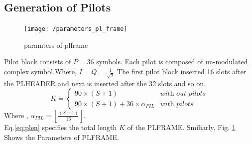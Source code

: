 \documentclass[journal,12pt,twocolumn]{IEEEtran}
\begin{document}
\subsection{Generation of Pilots}
%
\begin{figure}
\begin{center}
\texttt{[image: /parameters\_pl\_frame]}
\end{center}
\caption{paramters of plframe}
\label{fig:plframe}
\end{figure}
%
Pilot block consists of $P=36$ symbols. Each pilot is composed of un-modulated complex symbol.Where, $I=Q=\frac{1}{\sqrt{2}}$ The first pilot block inserted 16 slots after the PLHEADER and next is inserted after the 32 slots and so on.
\begin{equation}\label{eq:plen}
K = 
\begin{cases}
90\times (S+1)  & \textit{with out pilots}
\\
90\times (S+1) + 36\times \alpha_{PIL}  & \textit{with pilots}
\end{cases}
\end{equation}
Where , $\alpha_{PIL}=\left\lfloor \frac{(S-1)}{16} \right\rfloor$.\\
Eq.\eqref{eq:plen} specifies the total length $K$ of the PLFRAME. Smiliarly, Fig. \ref{fig:plframe} Shows the Parameters of PLFRAME.

%
\end{document}
